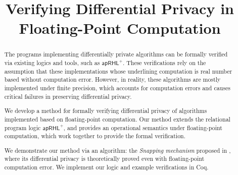 \documentclass[a4paper,11pt]{article}
\begin{document}
\title{Verifying Differential Privacy in Floating-Point Computation}
\author{}

\date{}
\maketitle
\begin{abstract}
The programs implementing differentially private algorithms can be formally verified via existing logics and tools, such as $\mathsf{apRHL}^+$\cite{barthe2016proving}. 
These verifications rely on the assumption that these implementations whose underlining computation is real number based without computation error.
However, in reality, these algorithms are mostly implemented under finite precision, which accounts for computation errors
and causes critical failures in preserving differential privacy. 

We develop a method for formally verifying differential privacy of algorithms implemented based on floating-point computation. Our method extends the relational program logic $\mathsf{apRHL}^+$, and provides an operational semantics under floating-point computation, which work together to provide the formal verification.

We demonstrate our method via an algorithm: the \emph{Snapping mechanism}  proposed in \cite{mironov2012significance}, where its  differential privacy is theoretically proved even with floating-point computation error.
We implement our logic and example verifications in Coq.
\end{abstract}
\end{document}
